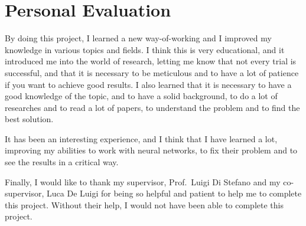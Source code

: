 \section{Personal Evaluation}\label{sec:personal-evaluation}
By doing this project, I learned a new way-of-working and I improved my knowledge in various topics and fields.
I think this is very educational, and it introduced me into the world of research, letting me know that not every trial is successful, and that it is necessary to be meticulous and to have a lot of patience if you want to achieve good results.
I also learned that it is necessary to have a good knowledge of the topic, and to have a solid background, to do a lot of researches and to read a lot of papers, to understand the problem and to find the best solution.

It has been an interesting experience, and I think that I have learned a lot, improving my abilities to work with neural networks, to fix their problem and to see the results in a critical way.

Finally, I would like to thank my supervisor, Prof.~Luigi Di Stefano and my co-supervisor, Luca De Luigi for being so helpful and patient to help me to complete this project.
Without their help, I would not have been able to complete this project.